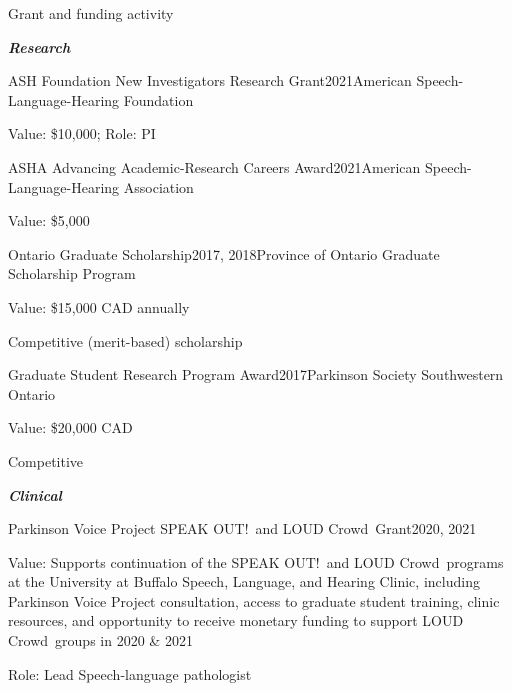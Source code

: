 \documentclass{resume} %
\begin{document}
\begin{rSection}{Grant and funding activity}

\begin{center}
	{\bf \emph{Research}}
\end{center}

\begin{rSubsection}{ASH Foundation New Investigators Research Grant}{2021}{American Speech-Language-Hearing Foundation}{}
	\item Value: \$10,000; Role: PI
\end{rSubsection}

\begin{rSubsection}{ASHA Advancing Academic-Research Careers Award}{2021}{American Speech-Language-Hearing Association}{}
	\item Value: \$5,000
\end{rSubsection}

\begin{rSubsection}{Ontario Graduate Scholarship}{2017, 2018}{Province of Ontario Graduate Scholarship Program}{}
	\item Value: \$15,000 CAD annually
	\item Competitive (merit-based) scholarship
\end{rSubsection}

\begin{rSubsection}{Graduate Student Research Program Award}{2017}{Parkinson Society Southwestern Ontario}{}
	\item Value: \$20,000 CAD
	\item Competitive
\end{rSubsection}
%


\begin{center}
	{\bf \emph{Clinical}}
\end{center}

\begin{rSubsection}{Parkinson Voice Project SPEAK OUT!\textregistered \ and LOUD Crowd\textregistered \ Grant}{2020, 2021}{}{} %
	\item Value: Supports continuation of the SPEAK OUT!\textregistered \ and LOUD Crowd\textregistered \ programs at the University at Buffalo Speech, Language, and Hearing Clinic, including Parkinson Voice Project consultation, access to graduate student training, clinic resources, and opportunity to receive monetary funding to support LOUD Crowd\textregistered \ groups in 2020 \& 2021
	\item Role: Lead Speech-language pathologist
\end{rSubsection}




\end{rSection}
\end{document}

